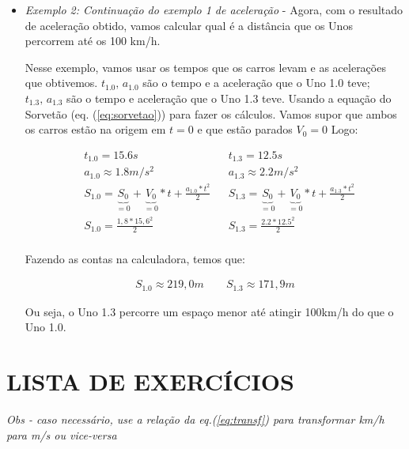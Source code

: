 \documentclass[12pt]{extarticle}
\newcommand{\<}{\langle}
\renewcommand{\>}{\rangle}
\theoremstyle{definition}
\begin{document}
\begin{itemize}
            \
            \item \textit{Exemplo 2: Continuação do exemplo 1 de aceleração} - Agora, com o resultado de aceleração obtido, vamos calcular qual é a distância que os Unos percorrem até os 100 km/h.
            
            Nesse exemplo, vamos usar os tempos que os carros levam e as acelerações que obtivemos. $t_{1.0},\, a_{1.0}$ são o tempo e a aceleração que o Uno 1.0 teve; $t_{1.3},\, a_{1.3}$ são o tempo e aceleração que o Uno 1.3 teve. Usando a equação do Sorvetão (eq. (\ref{eq:sorvetao})) para fazer os cálculos. Vamos supor que ambos os carros estão na origem em $t=0$ e que estão parados $V_0=0$ Logo:
            
            \begin{align*}
                &t_{1.0} = 15.6 s &  & t_{1.3} = 12.5 s \\
                &a_{1.0} \approx 1.8 m/s^2 & & a_{1.3} \approx 2.2 m/s^2 \\
                & S_{1.0} = \underbrace{S_0}_{=0} + \underbrace{V_0}_{=0}* t + \frac{a_{1.0}*t^2}{2} & & S_{1.3} = \underbrace{S_0}_{=0} + \underbrace{V_0}_{=0}* t + \frac{a_{1.3}*t^2}{2}  \\
                & S_{1.0} = \frac{1,8*15,6^2}{2} & & S_{1.3} = \frac{2.2*12.5^2}{2} \\
            \end{align*}
            
            Fazendo as contas na calculadora, temos que:
            
            \begin{align}
                \boxed{S_{1.0}\approx 219,0m \quad \quad S_{1.3}\approx 171,9m}
            \end{align}
            
            Ou seja, o Uno 1.3 percorre um espaço menor até atingir 100km/h do que o Uno 1.0.
        \end{itemize}
        
        \section*{LISTA DE EXERCÍCIOS}
        \textit{Obs - caso necessário, use a relação da eq.(\ref{eq:transf}) para transformar km/h para m/s ou vice-versa}
        
\end{document}
